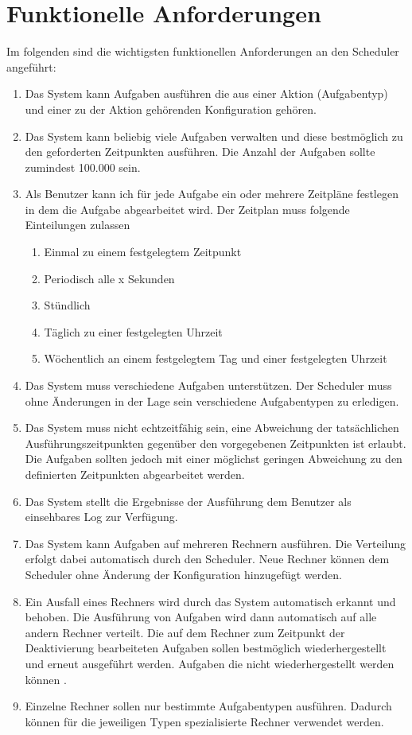 \section{Funktionelle Anforderungen}
Im folgenden sind die wichtigsten funktionellen Anforderungen an den Scheduler angeführt:
\begin{enumerate}
	\item Das System kann Aufgaben ausführen die aus einer Aktion (Aufgabentyp) und einer zu der Aktion gehörenden Konfiguration gehören.
	\item Das System kann beliebig viele Aufgaben verwalten und diese bestmöglich zu den geforderten Zeitpunkten ausführen.
	Die Anzahl der Aufgaben sollte zumindest 100.000 sein.
	\item Als Benutzer kann ich für jede Aufgabe ein oder mehrere Zeitpläne festlegen in dem die Aufgabe abgearbeitet wird. Der Zeitplan muss folgende Einteilungen zulassen
	\begin{enumerate}
		\item Einmal zu einem festgelegtem Zeitpunkt
		\item Periodisch alle x Sekunden
		\item Stündlich
		\item Täglich zu einer festgelegten Uhrzeit
		\item Wöchentlich an einem festgelegtem Tag und einer festgelegten Uhrzeit
	\end{enumerate}
	\item Das System muss verschiedene Aufgaben unterstützen. Der Scheduler muss ohne Änderungen in der Lage sein verschiedene Aufgabentypen zu erledigen. 
	\item Das System muss nicht echtzeitfähig sein, eine Abweichung der tatsächlichen Ausführungszeitpunkten gegenüber den vorgegebenen Zeitpunkten ist erlaubt. Die Aufgaben sollten jedoch mit einer möglichst geringen Abweichung zu den definierten Zeitpunkten abgearbeitet werden.
	\item Das System stellt die Ergebnisse der Ausführung dem Benutzer als einsehbares Log zur Verfügung.
	 \item Das System kann Aufgaben auf mehreren Rechnern ausführen. Die Verteilung erfolgt dabei automatisch durch den Scheduler. Neue Rechner können dem Scheduler ohne Änderung der Konfiguration hinzugefügt werden.
	 \item Ein Ausfall eines Rechners wird durch das System automatisch erkannt und behoben. Die Ausführung von Aufgaben wird dann automatisch auf alle andern Rechner verteilt. Die auf dem Rechner zum Zeitpunkt der Deaktivierung bearbeiteten Aufgaben sollen bestmöglich wiederhergestellt und erneut ausgeführt werden. Aufgaben die nicht wiederhergestellt werden können .
	 \item Einzelne Rechner sollen nur bestimmte Aufgabentypen ausführen. Dadurch können für die jeweiligen Typen spezialisierte Rechner verwendet werden.
\end{enumerate}

